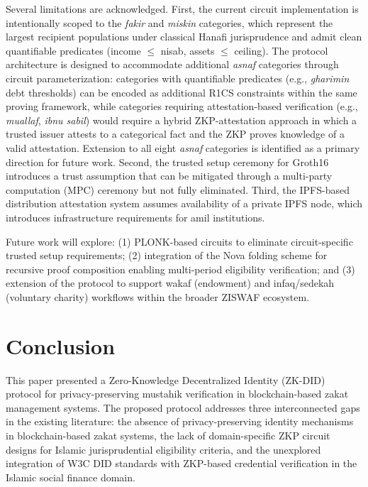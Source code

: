 \documentclass[conference]{IEEEtran}
\begin{document}
Several limitations are acknowledged. First, the current circuit implementation is intentionally scoped to the \textit{fakir} and \textit{miskin} categories, which represent the largest recipient populations under classical Hanafi jurisprudence and admit clean quantifiable predicates (income $\leq$ nisab, assets $\leq$ ceiling). The protocol architecture is designed to accommodate additional \textit{asnaf} categories through circuit parameterization: categories with quantifiable predicates (e.g., \textit{gharimin} debt thresholds) can be encoded as additional R1CS constraints within the same proving framework, while categories requiring attestation-based verification (e.g., \textit{muallaf}, \textit{ibnu sabil}) would require a hybrid ZKP-attestation approach in which a trusted issuer attests to a categorical fact and the ZKP proves knowledge of a valid attestation. Extension to all eight \textit{asnaf} categories is identified as a primary direction for future work. Second, the trusted setup ceremony for Groth16 introduces a trust assumption that can be mitigated through a multi-party computation (MPC) ceremony but not fully eliminated. Third, the IPFS-based distribution attestation system assumes availability of a private IPFS node, which introduces infrastructure requirements for amil institutions.

Future work will explore: (1) PLONK-based circuits to eliminate circuit-specific trusted setup requirements; (2) integration of the Nova folding scheme \cite{kothapalli2022} for recursive proof composition enabling multi-period eligibility verification; and (3) extension of the protocol to support wakaf (endowment) and infaq/sedekah (voluntary charity) workflows within the broader ZISWAF ecosystem.

\section{Conclusion}

This paper presented a Zero-Knowledge Decentralized Identity (ZK-DID) protocol for privacy-preserving mustahik verification in blockchain-based zakat management systems. The proposed protocol addresses three interconnected gaps in the existing literature: the absence of privacy-preserving identity mechanisms in blockchain-based zakat systems, the lack of domain-specific ZKP circuit designs for Islamic jurisprudential eligibility criteria, and the unexplored integration of W3C DID standards with ZKP-based credential verification in the Islamic social finance domain.
\end{document}

